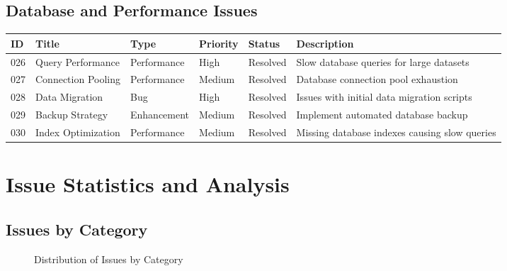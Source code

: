 \documentclass[12pt,a4paper]{article}
\begin{document}
\subsection{Database and Performance Issues}

\begin{longtable}{|p{0.8cm}|p{2.5cm}|p{1.5cm}|p{1.5cm}|p{1.5cm}|p{4.2cm}|}
\hline
\textbf{ID} & \textbf{Title} & \textbf{Type} & \textbf{Priority} & \textbf{Status} & \textbf{Description} \\
\hline
026 & Query Performance & Performance & High & Resolved & Slow database queries for large datasets \\
\hline
027 & Connection Pooling & Performance & Medium & Resolved & Database connection pool exhaustion \\
\hline
028 & Data Migration & Bug & High & Resolved & Issues with initial data migration scripts \\
\hline
029 & Backup Strategy & Enhancement & Medium & Resolved & Implement automated database backup \\
\hline
030 & Index Optimization & Performance & Medium & Resolved & Missing database indexes causing slow queries \\
\hline
\end{longtable}

\section{Issue Statistics and Analysis}

\subsection{Issues by Category}

\begin{figure}[H]
\centering
{}
\caption{Distribution of Issues by Category}
\label{fig:issues-by-category}
\end{figure}
\end{document}
